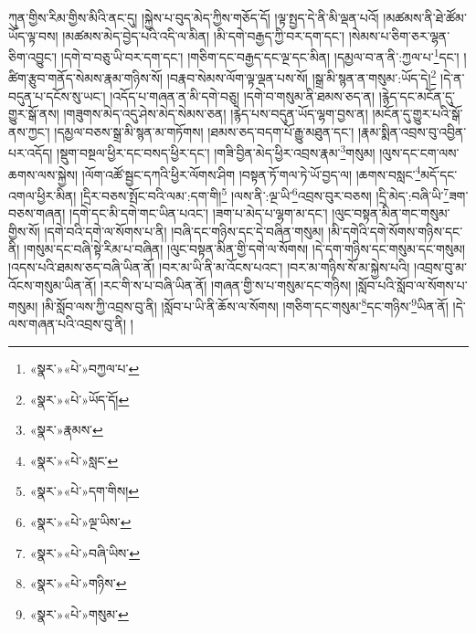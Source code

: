 ཀུན་གྱིས་རིམ་གྱིས་མིའི་ནང་དུ། །སྐྱེས་པ་བུད་མེད་ཀྱིས་གཅོད་དོ། །ལྟ་སྤྱད་དེ་ནི་མི་ལྡན་པའོ། །མཚམས་ནི་ཐེ་ཚོམ་ཡོད་ལྟ་བས། །མཚམས་མེད་བྱེད་པའི་འདི་ལ་མིན། །མི་དགེ་བརྒྱད་ཀྱི་བར་དག་དང་། །སེམས་པ་ཅིག་ཅར་ལྷན་ཅིག་འབྱུང་། །དགེ་བ་བཅུ་ཡི་བར་དག་དང་། །གཅིག་དང་བརྒྱད་དང་ལྔ་དང་མིན། །དམྱལ་བ་ན་ནི་:ཀྱལ་པ་\footnote{«སྣར་»«པེ་»བཀྱལ་པ་}དང་། །ཚིག་རྩུབ་གནོད་སེམས་རྣམ་གཉིས་སོ། །བརྣབ་སེམས་ལོག་ལྟ་ལྡན་པས་སོ། །སྒྲ་མི་སྙན་ན་གསུམ་:ཡོད་དེ།\footnote{«སྣར་»«པེ་»ཡོད་དོ།} །དེ་ན་བདུན་པ་དངོས་སུ་ཡང་། །འདོད་པ་གཞན་ན་མི་དགེ་བཅུ། །དགེ་བ་གསུམ་ནི་ཐམས་ཅད་ན། །རྙེད་དང་མངོན་དུ་གྱུར་སྒོ་ནས། །གཟུགས་མེད་འདུ་ཤེས་མེད་སེམས་ཅན། །རྙེད་པས་བདུན་ཡོད་ལྷག་བྱས་ན། །མངོན་དུ་གྱུར་པའི་སྒོ་ནས་ཀྱང་། །དམྱལ་བཅས་སྒྲ་མི་སྙན་མ་གཏོགས། །ཐམས་ཅད་བདག་པོ་རྒྱུ་མཐུན་དང་། །རྣམ་སྨིན་འབྲས་བུ་འབྱིན་པར་འདོད། །སྡུག་བསྔལ་ཕྱིར་དང་བསད་ཕྱིར་དང་། །གཟི་བྱིན་མེད་ཕྱིར་འབྲས་རྣམ་\footnote{«སྣར་»རྣམས་}གསུམ། །ལུས་དང་ངག་ལས་ཆགས་ལས་སྐྱེས། །ལོག་འཚོ་སྦྱང་དཀའི་ཕྱིར་ལོགས་ཤིག །བསྟན་ཏོ་གལ་ཏེ་ཡོ་བྱད་ལ། །ཆགས་བསླང་\footnote{«སྣར་»«པེ་»སླང་}མདོ་དང་འགལ་ཕྱིར་མིན། །དྲིར་བཅས་སྤོང་བའི་ལམ་:དག་གི།\footnote{«སྣར་»«པེ་»དག་གིས།} །ལས་ནི་:ལྔ་ཡི་\footnote{«སྣར་»«པེ་»ལྔ་ཡིས་}འབྲས་བུར་བཅས། །དྲི་མེད་:བཞི་ཡི་\footnote{«སྣར་»«པེ་»བཞི་ཡིས་}ཟག་བཅས་གཞན། །དགེ་དང་མི་དགེ་གང་ཡིན་པའང་། །ཟག་པ་མེད་པ་ལྷག་མ་དང་། །ལུང་བསྟན་མིན་གང་གསུམ་གྱིས་སོ། །དགེ་བའི་དགེ་ལ་སོགས་པ་ནི། །བཞི་དང་གཉིས་དང་དེ་བཞིན་གསུམ། །མི་དགེའི་དགེ་སོགས་གཉིས་དང་ནི། །གསུམ་དང་བཞི་སྟེ་རིམ་པ་བཞིན། །ལུང་བསྟན་མིན་གྱི་དགེ་ལ་སོགས། །དེ་དག་གཉིས་དང་གསུམ་དང་གསུམ། །འདས་པའི་ཐམས་ཅད་བཞི་ཡིན་ནོ། །བར་མ་ཡི་ནི་མ་འོངས་པའང་། །བར་མ་གཉིས་སོ་མ་སྐྱེས་པའི། །འབྲས་བུ་མ་འོངས་གསུམ་ཡིན་ནོ། །རང་གི་ས་པ་བཞི་ཡིན་ནོ། །གཞན་གྱི་ས་པ་གསུམ་དང་གཉིས། །སློབ་པའི་སློབ་ལ་སོགས་པ་གསུམ། །མི་སློབ་ལས་ཀྱི་འབྲས་བུ་ནི། །སློབ་པ་ཡི་ནི་ཆོས་ལ་སོགས། །གཅིག་དང་གསུམ་\footnote{«སྣར་»«པེ་»གཉིས་}དང་གཉིས་\footnote{«སྣར་»«པེ་»གསུམ་}ཡིན་ནོ། །དེ་ལས་གཞན་པའི་འབྲས་བུ་ནི། །
